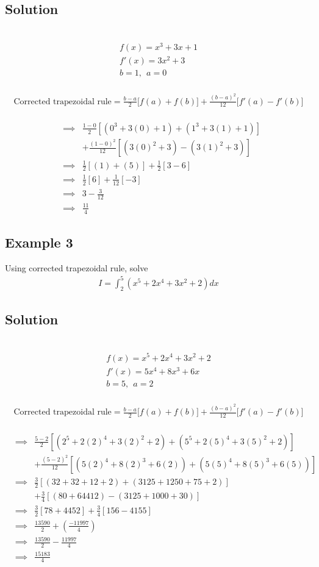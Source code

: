 \documentclass[12pt]{report}
\newcommand{\sps}{\\[0.2cm]}
\newcommand{\spn}[1]{\\[#1cm]}
\newcommand{\sprime}{'}
\begin{document}
	\subsection*{Solution}
	{~}\\[-2.1cm]
	\begin{gather*}
		f(x) = x^3 +3x + 1\sps
		f\sprime(x) = 3x^2 + 3\sps
		b=1,~~ a=0
	\end{gather*}
	{~}\\[-2.1cm]
	\begin{gather*}
		\text{Corrected trapezoidal rule} = \frac{b-a}{2}\Big[f(a) + f(b)\Big] + \frac{(b-a)^2}{12}\Big[f\sprime(a)-f\sprime(b)\Big]
	\end{gather*}
	{~}\\[-1.5cm]
	\begin{eqnarray*}
		&\implies&\frac{1-0}{2}\left[ (0^3 + 3(0) + 1) + (1^3 + 3(1) + 1) \right]\sps
		&& +\frac{(1-0)^2}{12}\left[ (3(0)^2 + 3) - (3(1)^2 + 3) \right]\spn{0.4}
		&\implies&\frac{1}{2}\left[(1) + (5)\right]+ \frac{1}{2}\left[3-6\right]\spn{0.4}
		&\implies&\frac{1}{2}\left[6\right]+ \frac{1}{12}\left[-3\right]\spn{0.4}
		&\implies& 3 - \frac{3}{12}\spn{0.4}
		&\implies&\frac{11}{4}
	\end{eqnarray*}
	
	
	
	\subsection{Example 3}
	Using corrected trapezoidal rule, solve
	\begin{eqnarray*}
		I = \int_2^5\left(x^5 + 2x^4 + 3x^2 + 2\right)dx
	\end{eqnarray*}
	
	\subsection*{Solution}
	{~}\\[-2.1cm]
	\begin{gather*}
		f(x) = x^5 + 2x^4 + 3x^2 + 2\sps
		f\sprime(x) = 5x^4 + 8x^3 + 6x \sps
		b=5,~~ a=2
	\end{gather*}
	{~}\\[-2.1cm]
	\begin{gather*}
		\text{Corrected trapezoidal rule} = \frac{b-a}{2}\Big[f(a) + f(b)\Big] + \frac{(b-a)^2}{12}\Big[f\sprime(a)-f\sprime(b)\Big]
	\end{gather*}
	{~}\\[-1.5cm]
	\begin{eqnarray*}
		&\implies&\frac{5-2}{2}\left[ (2^5 + 2(2)^4 + 3(2)^2 + 2) + (5^5 + 2(5)^4 + 3(5)^2 + 2) \right]\sps
		&& +\frac{(5-2)^2}{12}\left[ (5(2)^4 + 8(2)^3 + 6(2)) + (5(5)^4 + 8(5)^3 + 6(5))  \right]\spn{0.4}
		&\implies& \frac{3}{2}[(32+32+12+2) + (3125+1250+75+2)] \sps
		&& +\frac{3}{4}\left[ (80+64412) - (3125+1000+30) \right]   \spn{0.4}
		&\implies&  \frac{3}{2}[78+4452] + \frac{3}{4}[156 - 4155] \spn{0.4}
		&\implies& \frac{13590}{2} + \left(\frac{-11997}{4}\right)\spn{0.4}
		&\implies&\frac{13590}{2} - \frac{11997}{4}\spn{0.4}
		&\implies& \frac{15183}{4} 
	\end{eqnarray*}
	
\end{document}
